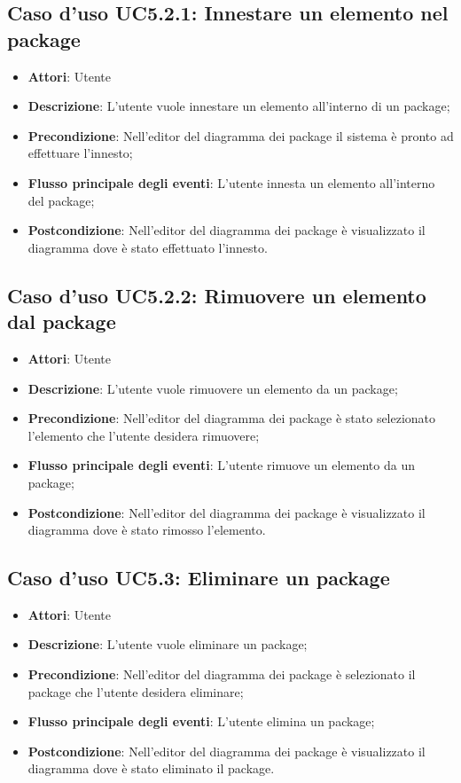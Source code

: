 \documentclass[../AnalisiDeiRequisiti.tex]{subfiles}
\begin{document}
			\subsection{Caso d'uso UC5.2.1: Innestare un elemento nel package}
			\begin{itemize}
				\item \textbf{Attori}: Utente
				\item \textbf{Descrizione}: L'utente vuole innestare un elemento all'interno di un package;
				\item \textbf{Precondizione}: Nell'editor del diagramma dei package il sistema è pronto ad effettuare l'innesto;
				\item \textbf{Flusso principale degli eventi}: L'utente innesta un elemento all'interno del package;
				\item \textbf{Postcondizione}: Nell'editor del diagramma dei package è visualizzato il diagramma dove è stato effettuato l'innesto.
			\end{itemize}
			\subsection{Caso d'uso UC5.2.2: Rimuovere un elemento dal package}
			\begin{itemize}
				\item \textbf{Attori}: Utente
				\item \textbf{Descrizione}: L'utente vuole rimuovere un elemento da un package;
				\item \textbf{Precondizione}: Nell'editor del diagramma dei package è stato selezionato l'elemento che l'utente desidera rimuovere;
				\item \textbf{Flusso principale degli eventi}: L'utente rimuove un elemento da un package;
				\item \textbf{Postcondizione}: Nell'editor del diagramma dei package è visualizzato il diagramma dove è stato rimosso l'elemento.
			\end{itemize}
			\subsection{Caso d'uso UC5.3: Eliminare un package}
			\begin{itemize}
				\item \textbf{Attori}: Utente
				\item \textbf{Descrizione}: L'utente vuole eliminare un package;
				\item \textbf{Precondizione}: Nell'editor del diagramma dei package è selezionato il package che l'utente desidera eliminare;
				\item \textbf{Flusso principale degli eventi}: L'utente elimina un package;
				\item \textbf{Postcondizione}: Nell'editor del diagramma dei package è visualizzato il diagramma dove è stato eliminato il package.
			\end{itemize}
\end{document}
